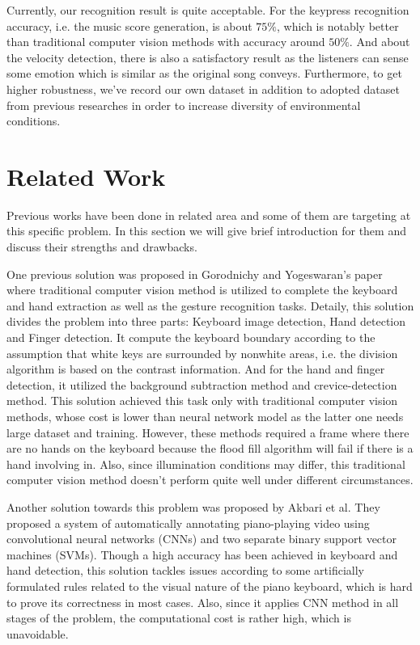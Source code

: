 \documentclass[10pt,twocolumn,letterpaper]{article}
\begin{document}
   Currently, our recognition result is quite acceptable. For the keypress recognition accuracy, i.e. the music score generation, is about \(75\%\), which is notably better than traditional computer vision methods with accuracy around \(50\%\).
   And about the velocity detection, there is also a satisfactory result as the listeners can sense some emotion which is similar as the original song conveys.
   Furthermore, to get higher robustness, we've record our own dataset in addition to adopted dataset from previous researches in order to increase diversity of environmental conditions. 
   
\section{Related Work}
   Previous works have been done in related area and some of them are targeting at this specific problem. In this section we will give brief introduction for them and discuss their strengths and drawbacks.

   One previous solution was proposed in Gorodnichy and Yogeswaran's paper \cite{gorodnichy2006detection} where traditional computer vision method is utilized to complete the keyboard and hand extraction as well as the gesture recognition tasks.
   Detaily, this solution divides the problem into three parts: Keyboard image detection, Hand detection and Finger detection. 
   It compute the keyboard boundary according to the assumption that white keys are surrounded by nonwhite areas, i.e. the division algorithm is based on the contrast information.
   And for the hand and finger detection, it utilized the background subtraction method and crevice-detection method.
   This solution achieved this task only with traditional computer vision methods, whose cost is lower than neural network model as the latter one needs large dataset and training.
   However, these methods required a frame where there are no hands on the keyboard because the flood fill algorithm will fail if there is a hand involving in.
   Also, since illumination conditions may differ, this traditional computer vision method doesn't perform quite well under different circumstances.

   Another solution towards this problem was proposed by Akbari et al. \cite{Akbari} 
   They proposed a system of automatically annotating piano-playing video using convolutional neural networks (CNNs) and two separate binary support vector machines (SVMs).
   Though a high accuracy has been achieved in keyboard and hand detection, this solution tackles issues according to some artificially formulated rules related to the visual nature of the piano keyboard, which is hard to prove its correctness in most cases.
   Also, since it applies CNN method in all stages of the problem, the computational cost is rather high, which is unavoidable.
\end{document}
